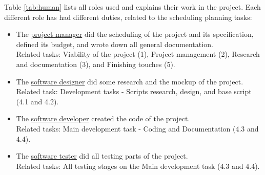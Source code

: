 Table \ref{tab:human} lists all roles used and explains their work in the project. Each different role has had different duties, related to the scheduling planning tasks:

\begin{itemize}
\item The \underline{project manager} did the scheduling of the project and its specification, defined its budget, and wrote down all general documentation.\\ Related tasks: Viability of the project (1), Project management (2), Research and documentation (3), and Finishing touches (5).
\item The \underline{software designer} did some research and the mockup of the project.\\ Related task: Development tasks - Scripts research, design, and base script (4.1 and 4.2).
\item The \underline{software developer} created the code of the project.\\ Related tasks: Main development task - Coding and Documentation (4.3 and 4.4).
\item The \underline{software tester} did all testing parts of the project.\\ Related tasks: All testing stages on the Main development task (4.3 and 4.4).
\end{itemize}

\pagebreak

